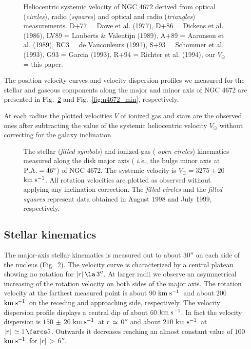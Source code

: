 \documentclass[twocolumns]{aa}
\def\kms{$\rm km\;s^{-1}$}
\def\dg{^\circ}
\begin{document}
 
\begin{figure}[ht]
\vspace*{8.5cm}
\caption[]{Heliocentric systemic velocity of NGC 4672 derived from
  optical ({\it circles\/}), radio ({\it squares\/}) and optical and
  radio ({\it triangles\/}) measurements. D+77 = Dawe et al.
  (1977), D+86 = Dickens et al. (1986), LV89 =
  Lauberts \& Valentijn (1989), A+89 = Aaronson et al. (1989), RC3 = de
  Vaucouleurs (1991), S+93 = Schommer et al. (1993), G93 = 
  Garcia (1993), R+94 = Richter et al. (1994), our $V_\odot$ = this paper.} 
\label{fig:n4672_helio}
\end{figure}


\bigskip

The position-velocity curves and velocity dispersion profiles we
me\-asured for the stellar and gaseous components along the major and
minor axis of NGC 4672 are presented in Fig.~\ref{fig:n4672_maj} and
Fig.~\ref{fig:n4672_min}, respectively.

At each radius the plotted velocities $V$ of ionized gas and stars are
the observed ones after subtracting the value of the systemic
heliocentric velocity $V_\odot$ without correcting for the galaxy
inclination.


\begin{figure}[ht]
\vspace*{7.5cm}
\caption[]{The stellar ({\it filled symbols\/}) and ionized-gas ({\it
  open circles}) kinematics measured along the disk major axis ({\it
  i.e.\/}, the bulge minor axis at $\rm P.A.=46\dg$) of NGC 4672. The
  systemic velocity is $V_\odot = 3275 \pm 20$ \kms. All rotation
  velocities are plotted as observed without applying any inclination
  correction.  The {\it filled circles\/} and the {\it filled squares\/}
  represent data obtained in August 1998 and July 1999, respectively.}
\label{fig:n4672_maj}
\end{figure}

 
\subsection{Stellar kinematics}

The major-axis stellar kinematics is measured out to abo\-ut $30''$ on
each side of the nucleus (Fig.~\ref{fig:n4672_maj}). The velocity
curve is characterized by a central plateau showing no rotation for
$|r|\,\la\,3''$. At larger radii we observe an asymmetrical increasing
of the rotation velocity on both sides of the major axis. The
rotation velocity at the farthest measured point is about $90$ \kms\
and about $200$ \kms\ on the receding and approaching side,
respectively.  The velocity dispersion profile displays a central dip
of about $60$ \kms . In fact the velocity dispersion is $150\,\pm\,20$
\kms\ at $r\,\simeq\,0''$ and about $210$
\kms\ at $|r|\,\simeq1\,\farcs5$. Outwards it decreases reaching an
almost constant value of $100$ \kms\ for $|r|\,>\,6''$.
\end{document}
